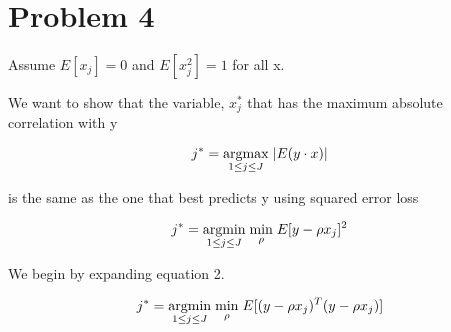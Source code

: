 \documentclass[11pt]{article}
\begin{document}
\begin{center}

\ \\
\end{center}


\section*{Problem 4}

Assume $E[x_j] = 0$ and $E[x_j^2] = 1$ for all x.

We want to show that the variable, $x_j^*$ that has the maximum absolute correlation with y 

\begin{equation}
j^* = \underset{1 \leq j \leq J}{\operatorname{argmax}}\hspace{1mm}|E(y \cdot x)|
\end{equation}

is the same as the one that best predicts y using squared error loss

\begin{equation}
j^* = \underset{1 \leq j \leq J}{\operatorname{argmin}} \hspace{1mm} \underset{\rho}{\operatorname{min}} \hspace{1mm} E[y - \rho x_j]^2
\end{equation}

We begin by expanding equation 2. 

$$j^* = \underset{1 \leq j \leq J}{\operatorname{argmin}} \hspace{1mm} \underset{\rho}{\operatorname{min}} \hspace{1mm} E[(y - \rho x_j)^T ( y- \rho x_j)]$$ 
\end{document}
